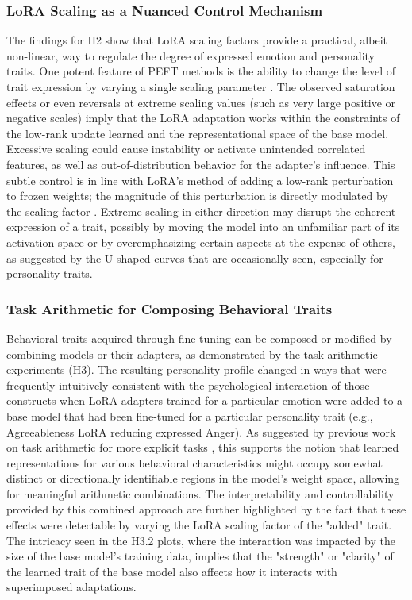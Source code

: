 \documentclass{DESSThesis}
\begin{document}
\subsubsection{LoRA Scaling as a Nuanced Control Mechanism}
The findings for H2 show that LoRA scaling factors provide a practical, albeit non-linear, way to regulate the degree of expressed emotion and personality traits. One potent feature of PEFT methods is the ability to change the level of trait expression by varying a single scaling parameter \cite{hu_lora_2021}. The observed saturation effects or even reversals at extreme scaling values (such as very large positive or negative scales) imply that the LoRA adaptation works within the constraints of the low-rank update learned and the representational space of the base model. Excessive scaling could cause instability or activate unintended correlated features, as well as out-of-distribution behavior for the adapter's influence. This subtle control is in line with LoRA's method of adding a low-rank perturbation to frozen weights; the magnitude of this perturbation is directly modulated by the scaling factor \cite{biderman_lora_2024, zhao_lora_2024}. Extreme scaling in either direction may disrupt the coherent expression of a trait, possibly by moving the model into an unfamiliar part of its activation space or by overemphasizing certain aspects at the expense of others, as suggested by the U-shaped curves that are occasionally seen, especially for personality traits.

\subsubsection{Task Arithmetic for Composing Behavioral Traits}
Behavioral traits acquired through fine-tuning can be composed or modified by combining models or their adapters, as demonstrated by the task arithmetic experiments (H3). The resulting personality profile changed in ways that were frequently intuitively consistent with the psychological interaction of those constructs when LoRA adapters trained for a particular emotion were added to a base model that had been fine-tuned for a particular personality trait (e.g., Agreeableness LoRA reducing expressed Anger). As suggested by previous work on task arithmetic for more explicit tasks \cite{ilharco_editing_2023, chronopoulou_language_2023}, this supports the notion that learned representations for various behavioral characteristics might occupy somewhat distinct or directionally identifiable regions in the model's weight space, allowing for meaningful arithmetic combinations. The interpretability and controllability provided by this combined approach are further highlighted by the fact that these effects were detectable by varying the LoRA scaling factor of the "added" trait. The intricacy seen in the H3.2 plots, where the interaction was impacted by the size of the base model's training data, implies that the "strength" or "clarity" of the learned trait of the base model also affects how it interacts with superimposed adaptations.
\end{document}

